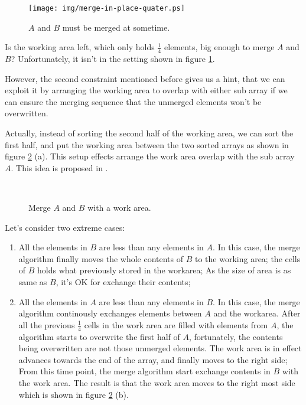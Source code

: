 \documentclass{article}
\begin{document}
\begin{figure}[htbp]
 \centering
 \texttt{[image: img/merge-in-place-quater.ps]}
 \caption{$A$ and $B$ must be merged at sometime.}
 \label{fig:merge-in-place-quater}
\end{figure}

Is the working area left, which only holds $\frac{1}{4}$ elements, big enough to merge
$A$ and $B$? Unfortunately, it isn't in the setting shown in figure \ref{fig:merge-in-place-quater}.

However, the second constraint mentioned before gives us a hint, that we can exploit
it by arranging the working area to overlap with either sub array if we can ensure the
merging sequence that the unmerged elements won't be overwritten.

Actually, instead of sorting the second half of the working area, we can sort the first
half, and put the working area between the two sorted arrays as shown in figure \ref{fig:merge-in-place-setup} (a).
This setup effects arrange the work area overlap with the sub array $A$. This idea
is proposed in \cite{msort-in-place}.

\begin{figure}[htbp]
 \centering
  \\
 \caption{Merge $A$ and $B$ with a work area.}
 \label{fig:merge-in-place-setup}
\end{figure}

Let's consider two extreme cases:

\begin{enumerate}
\item All the elements in $B$ are less than any elements in $A$. In this case, the merge algorithm
finally moves the whole contents of $B$ to the working area; the cells of $B$ holds what previously
stored in the workarea; As the size of area is as same as $B$, it's OK for exchange their contents;
\item All the elements in $A$ are less than any elements in $B$. In this case, the merge algorithm
continously exchanges elements between $A$ and the workarea. After all the previous $\frac{1}{4}$ 
cells in the work area are filled with elements from $A$, the algorithm starts to overwrite the
first half of $A$, fortunately, the contents being overwritten are not those unmerged elements.
The work area is in effect advances towards the end of the array, and finally moves to the right
side; From this time point, the merge algorithm start exchange contents in $B$ with the work area.
The result is that the work area moves to the right most side which is shown in figure \ref{fig:merge-in-place-setup} (b).
\end{enumerate}
\end{document}
